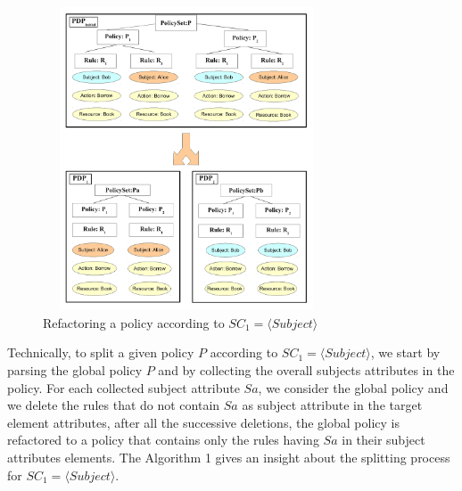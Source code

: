 \begin{figure}[!h]
\begin{center}
\includegraphics[width=8.5cm, height=9cm]{splitting}
\caption{Refactoring a policy according to $SC_{1}=\langle Subject\rangle$}
\label{splitting}
\end{center}
\end{figure}

Technically, to split a given policy $P$ according to $SC_{1}=\langle Subject\rangle$, we start by parsing the global policy $P$ 
and by collecting the overall subjects attributes in the policy. For each collected subject attribute $Sa$, we consider the global policy and we 
delete the rules that do not contain $Sa$ as subject attribute in the target element attributes, after all the successive deletions, the global 
policy is refactored to a policy that contains only the rules having $Sa$ in their subject attributes elements.
The Algorithm 1 gives an insight about the splitting process for $SC_{1}=\langle Subject\rangle$.

